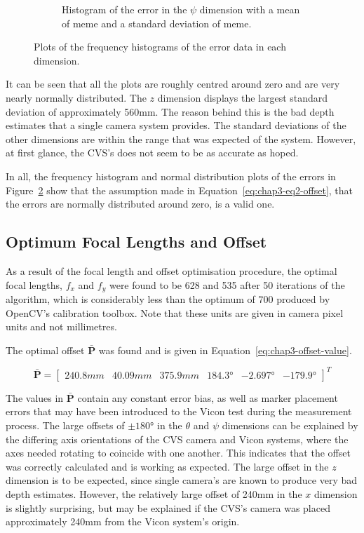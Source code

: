 \begin{figure}
\begin{subfigure}{0.45\textwidth}
     \caption{Histogram of the error in the $\psi$ dimension with a mean of meme and a standard deviation of meme. }
  \label{fig:norm-yaw}
  \end{subfigure}
  \caption[Plots of the frequency histograms of the error data in each dimension.]{Plots of the frequency histograms of the error data in each dimension.}
  \label{fig:err-norm}
\end{figure}

It can be seen that all the plots are roughly centred around zero and are very nearly normally distributed. The $z$ dimension displays the largest standard deviation of approximately 560mm. The reason behind this is the bad depth estimates that a single camera system provides. The standard deviations of the other dimensions are within the range that was expected of the system. However, at first glance, the CVS's does not seem to be as accurate as hoped. 

In all, the frequency histogram and normal distribution plots of the errors in Figure~\ref{fig:err-norm} show that the assumption made in Equation~\ref{eq:chap3-eq2-offset}, that the errors are normally distributed around zero, is a valid one. 

\subsection{Optimum Focal Lengths and Offset}

As a result of the focal length and offset optimisation procedure, the optimal focal lengths, $f_x$ and $f_y$ were found to be 628 and 535 after 50 iterations of the algorithm, which is considerably less than the optimum of 700 produced by OpenCV's calibration toolbox. Note that these units are given in camera pixel units and not millimetres.

The optimal offset $\bar{\bm{P}}$ was found and is given in Equation~\ref{eq:chap3-offset-value}.

\begin{equation}
  \label{eq:chap3-offset-value}
  \bar{\bm{P}} = 
  \begin{bmatrix}
    240.8mm & 40.09mm & 375.9mm & \ang{184.3} & \ang{-2.697} & \ang{-179.9}
  \end{bmatrix}^T
\end{equation}

The values in $\bar{\bm{P}}$ contain any constant error bias, as well as marker placement errors that may have been introduced to the Vicon test during the measurement process. The large offsets of $\pm\ang{180}$ in the $\theta$ and $\psi$ dimensions can be explained by the differing axis orientations of the CVS camera and Vicon systems, where the axes needed rotating to coincide with one another. This indicates that the offset was correctly calculated and is working as expected. The large offset in the $z$ dimension is to be expected, since single camera's are known to produce very bad depth estimates. However, the relatively large offset of 240mm in the $x$ dimension is slightly surprising, but may be explained if the CVS's camera was placed approximately 240mm from the Vicon system's origin. 

